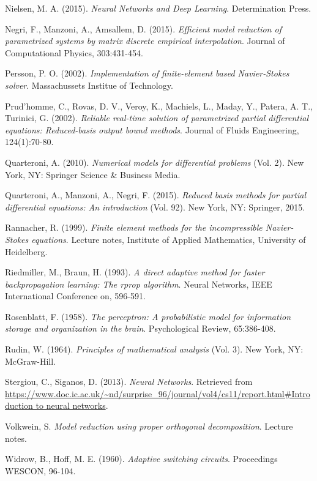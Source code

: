 \documentclass[12pt, a4paper, twoside, openright, notitlepage]{report}
\numberwithin{equation}{chapter}
\theoremstyle{theorem}
\theoremstyle{definition}
\theoremstyle{remark}
\theoremstyle{proposition}
\numberwithin{figure}{chapter}
\begin{document}
\begin{thebibliography}{50}
		Nielsen, M. A. (2015). \emph{Neural Networks and Deep Learning}. Determination Press.
				
		Negri, F., Manzoni, A., Amsallem, D. (2015). \emph{Efficient model reduction of parametrized systems by matrix discrete empirical interpolation}. Journal of Computational Physics, 303:431-454.
		
		Persson, P. O. (2002). \emph{Implementation of finite-element based Navier-Stokes solver}. Massachussets Institue of Technology.
		
		Prud'homme, C., Rovas, D. V., Veroy, K., Machiels, L., Maday, Y., Patera, A. T., Turinici, G. (2002). \emph{Reliable real-time solution of parametrized partial differential equations: Reduced-basis output bound methods}. Journal of Fluids Engineering, 124(1):70-80.
		
		Quarteroni, A. (2010). \emph{Numerical models for differential problems} (Vol. 2). New York, NY: Springer Science \& Business Media.
		
		Quarteroni, A., Manzoni, A., Negri, F. (2015). \emph{Reduced basis methods for partial differential equations: An introduction} (Vol. 92). New York, NY: Springer, 2015.
		
		Rannacher, R. (1999). \emph{Finite element methods for the incompressible Navier-Stokes equations}. Lecture notes, Institute of Applied Mathematics, University of Heidelberg.
		
		Riedmiller, M., Braun, H. (1993). \emph{A direct adaptive method for faster backpropagation learning: The rprop algorithm}. Neural Networks, IEEE International Conference on, 596-591.
		
		Rosenblatt, F. (1958). \emph{The perceptron: A probabilistic model for information storage and organization in the brain}. Psychological Review, 65:386-408.
		
		Rudin, W. (1964). \emph{Principles of mathematical analysis} (Vol. 3). New York, NY: McGraw-Hill.
		
		Stergiou, C., Siganos, D. (2013). \emph{Neural Networks}. Retrieved from \url{https://www.doc.ic.ac.uk/~nd/surprise_96/journal/vol4/cs11/report.html#Introduction to neural networks}.
		
		Volkwein, S. \emph{Model reduction using proper orthogonal decomposition}. Lecture notes.
		
		Widrow, B., Hoff, M. E. (1960). \emph{Adaptive switching circuits}. Proceedings WESCON, 96-104.
		
	\end{thebibliography}	
	
\end{document}
